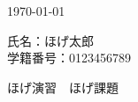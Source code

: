 \documentclass[lualatex]{jlreq}
\begin{document}
\begin{flushleft}
  \today
\end{flushleft}

\begin{flushright}
  氏名：ほげ太郎\\ 学籍番号：0123456789
\end{flushright}
\vspace{2\zh}

\begin{center}
  {\Large ほげ演習　ほげ課題}
\end{center}
\vspace{3\zh}




\end{document}
